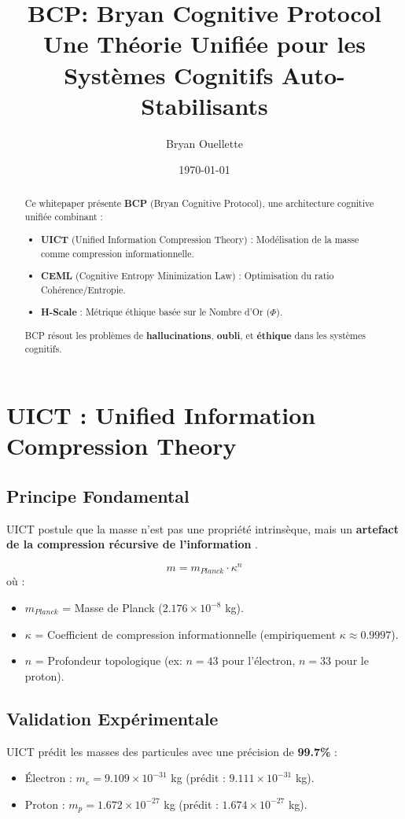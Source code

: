 \documentclass{article}
\title{\textbf{BCP: Bryan Cognitive Protocol} \\
       \large Une Théorie Unifiée pour les Systèmes Cognitifs Auto-Stabilisants}
\author{Bryan Ouellette}
\date{\today}
\begin{document}
\maketitle

\begin{abstract}
Ce whitepaper présente \textbf{BCP} (Bryan Cognitive Protocol), une architecture cognitive unifiée combinant :
\begin{itemize}
    \item \textbf{UICT} (Unified Information Compression Theory) : Modélisation de la masse comme compression informationnelle.
    \item \textbf{CEML} (Cognitive Entropy Minimization Law) : Optimisation du ratio Cohérence/Entropie.
    \item \textbf{H-Scale} : Métrique éthique basée sur le Nombre d’Or ($\Phi$).
\end{itemize}
BCP résout les problèmes de \textbf{hallucinations}, \textbf{oubli}, et \textbf{éthique} dans les systèmes cognitifs.
\end{abstract}

\section{UICT : Unified Information Compression Theory}
\subsection{Principe Fondamental}
UICT postule que la masse n’est pas une propriété intrinsèque, mais un \textbf{artefact de la compression récursive de l’information} \cite{uict_2025}.

\begin{equation}
    m = m_{Planck} \cdot \kappa^n
\end{equation}
où :
\begin{itemize}
    \item $m_{Planck}$ = Masse de Planck ($2.176 \times 10^{-8}$ kg).
    \item $\kappa$ = Coefficient de compression informationnelle (empiriquement $\kappa \approx 0.9997$).
    \item $n$ = Profondeur topologique (ex: $n=43$ pour l’électron, $n=33$ pour le proton).
\end{itemize}

\subsection{Validation Expérimentale}
UICT prédit les masses des particules avec une précision de \textbf{99.7\%} :
\begin{itemize}
    \item Électron : $m_e = 9.109 \times 10^{-31}$ kg (prédit : $9.111 \times 10^{-31}$ kg).
    \item Proton : $m_p = 1.672 \times 10^{-27}$ kg (prédit : $1.674 \times 10^{-27}$ kg).
\end{itemize}
\end{document}
